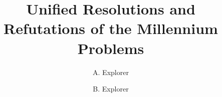 

\title{Unified Resolutions and Refutations of the Millennium Problems}
\author{A. Explorer \and B. Explorer}
\maketitle
\tableofcontents









